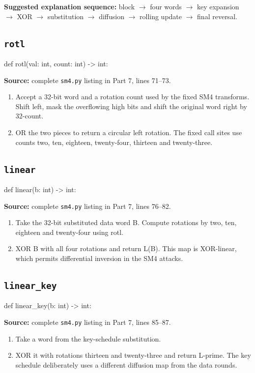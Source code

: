 \noindent\textbf{Suggested explanation sequence:} block $\rightarrow$ four words $\rightarrow$ key expansion $\rightarrow$ XOR $\rightarrow$ substitution $\rightarrow$ diffusion $\rightarrow$ rolling update $\rightarrow$ final reversal.

\subsection{\texttt{rotl}}
\begin{lightcode}
def rotl(val: int, count: int) -> int:
\end{lightcode}
\noindent\textbf{Source:} complete \texttt{sm4.py} listing in Part 7, lines 71--73.
\begin{enumerate}
\item Accept a 32-bit word and a rotation count used by the fixed SM4 transforms. Shift left, mask the overflowing high bits and shift the original word right by 32-count.
\item OR the two pieces to return a circular left rotation. The fixed call sites use counts two, ten, eighteen, twenty-four, thirteen and twenty-three.
\end{enumerate}
\subsection{\texttt{linear}}
\begin{lightcode}
def linear(b: int) -> int:
\end{lightcode}
\noindent\textbf{Source:} complete \texttt{sm4.py} listing in Part 7, lines 76--82.
\begin{enumerate}
\item Take the 32-bit substituted data word B. Compute rotations by two, ten, eighteen and twenty-four using rotl.
\item XOR B with all four rotations and return L(B). This map is XOR-linear, which permits differential inversion in the SM4 attacks.
\end{enumerate}
\subsection{\texttt{linear\_\allowbreak{}key}}
\begin{lightcode}
def linear_key(b: int) -> int:
\end{lightcode}
\noindent\textbf{Source:} complete \texttt{sm4.py} listing in Part 7, lines 85--87.
\begin{enumerate}
\item Take a word from the key-schedule substitution.
\item XOR it with rotations thirteen and twenty-three and return L-prime. The key schedule deliberately uses a different diffusion map from the data rounds.
\end{enumerate}

